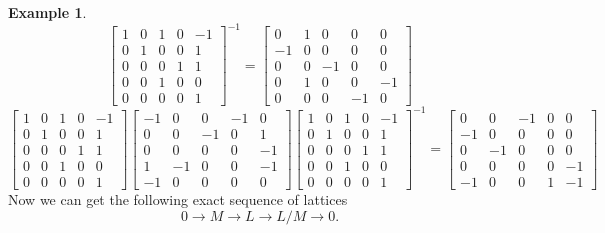 \documentclass{article}
\theoremstyle{plain}
\theoremstyle{definition}
\newtheorem{example}[theorem]{Example}
\begin{document}
\begin{example}
$$ \left[\begin{array}{rrrrr}
1 & 0 & 1 & 0 & -1 \\
0 & 1 & 0 & 0 & 1 \\
0 & 0 & 0 & 1 & 1 \\
0 & 0 & 1 & 0 & 0 \\
0 & 0 & 0 & 0 & 1
\end{array}\right]^{-1}
= 
\left[\begin{array}{rrr|rr}
0 & 1 & 0 & 0 & 0 \\
-1 & 0 & 0 & 0 & 0 \\
0 & 0 & -1 & 0 & 0 \\
\hline
0 & 1 & 0 & 0 & -1 \\
0 & 0 & 0 & -1 & 0
\end{array}\right]
$$
$$
 \left[\begin{array}{rrrrr}
1 & 0 & 1 & 0 & -1 \\
0 & 1 & 0 & 0 & 1 \\
0 & 0 & 0 & 1 & 1 \\
0 & 0 & 1 & 0 & 0 \\
0 & 0 & 0 & 0 & 1
\end{array}\right]
\left[\begin{array}{rrrrr}
-1 & 0 & 0 & -1 & 0 \\
0 & 0 & -1 & 0 & 1 \\
0 & 0 & 0 & 0 & -1 \\
1 & -1 & 0 & 0 & -1 \\
-1 & 0 & 0 & 0 & 0
\end{array}\right]
 \left[\begin{array}{rrrrr}
1 & 0 & 1 & 0 & -1 \\
0 & 1 & 0 & 0 & 1 \\
0 & 0 & 0 & 1 & 1 \\
0 & 0 & 1 & 0 & 0 \\
0 & 0 & 0 & 0 & 1
\end{array}\right]^{-1}
= 
\left[\begin{array}{rrr|rr}
0 & 0 & -1 & 0 & 0 \\
-1 & 0 & 0 & 0 & 0 \\
0 & -1 & 0 & 0 & 0 \\
\hline
0 & 0 & 0 & 0 & -1 \\
-1 & 0 & 0 & 1 & -1
\end{array}\right]
$$
Now we can get the following exact sequence of lattices 
$$0 \longrightarrow M \longrightarrow L \longrightarrow L/M \longrightarrow 0.$$ 
\end{example}
\end{document}
